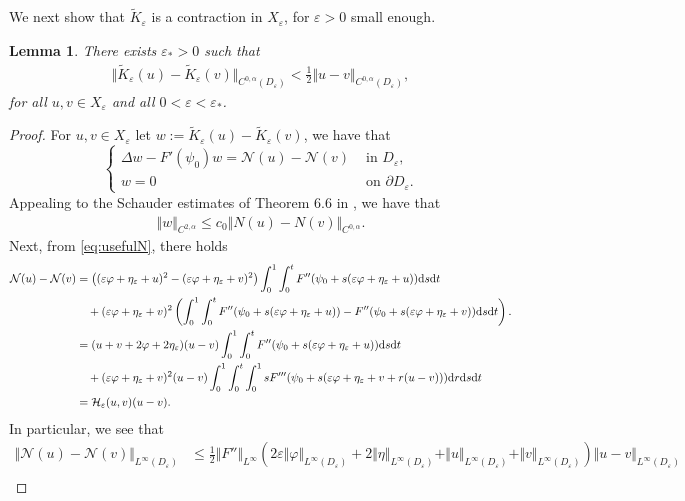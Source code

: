 \documentclass[11pt,reqno]{amsproc}
\newcommand{\N}{\mathcal{N}}
\newcommand{\ve}{\varepsilon}
\newcommand{\rmd}{{\rm d}}
\numberwithin{equation}{section}
\numberwithin{theorem}{section}
\numberwithin{prop}{section}
\numberwithin{cor}{section}
\newtheorem{lemma}{Lemma}
\numberwithin{lemma}{section}
\theoremstyle{remark}
\theoremstyle{definition}
\begin{document}
We next show that $\widetilde{K}_\ve$ is a contraction in $X_\ve$,  for $\ve>0$ small enough.
\begin{lemma}\label{lemma:contraction}
There exists $\ve_*>0$ such that 
\begin{align*}
\Vert \widetilde{K}_\ve(u) - \widetilde{K}_\ve(v) \Vert_{C^{0,\alpha}(D_\ve)} < \frac12 \Vert u - v \Vert_{C^{0,\alpha}(D_\ve)},
\end{align*}
for all $u,v\in X_\ve$ and all $0< \ve < \ve_*$.
\end{lemma}

\begin{proof}
For  $u,v\in X_\ve$ let $w:=\widetilde{K}_\ve(u) - \widetilde{K}_\ve(v)$, we have that 
\begin{equation}
\begin{cases}
\Delta w  - F'(\psi_0)w=  \N(u) - \N(v)  & \text{ in } D_\ve, \\
w = 0 & \text{ on } \partial D_\ve.
\end{cases}
\end{equation}
Appealing to the Schauder estimates of Theorem 6.6 in \cite{gilbargtrudinger}, we have that
\begin{align*}
\Vert w \Vert_{C^{2,\alpha}} \leq c_0 \Vert N(u) - N(v) \Vert_{C^{0,\alpha}}.
\end{align*}
Next, from \eqref{eq:usefulN}, there holds
\begin{align*}
\N(u) - \N(v) &= \left( (\ve\varphi + \eta_\ve + u)^2 - (\ve\varphi + \eta_\ve + v)^2 \right) \int_0^1 \int_0^t F''(\psi_0 + s(\ve\varphi + \eta_\ve + u)) \rmd s \rmd t \\
&\quad +(\ve\varphi + \eta_\ve + v)^2 \left( \int_0^1 \int_0^t F''(\psi_0 + s(\ve\varphi + \eta_\ve + u)) - F''(\psi_0 + s(\ve\varphi + \eta_\ve + v)) \rmd s \rmd t \right). \\
&= (u + v + 2\varphi + 2\eta_\ve)(u-v) \int_0^1 \int_0^t F''(\psi_0 + s(\ve\varphi + \eta_\ve + u)) \rmd s \rmd t \\
&\quad + (\ve\varphi + \eta_\ve + v)^2 (u-v) \int_0^1 \int_0^t \int_0^1 sF'''(\psi_0 + s(\ve\varphi + \eta_\ve + v + r(u-v))) \rmd r \rmd s \rmd t \\
&=\mathcal{H}_\ve(u,v) (u-v).
\end{align*}
In particular, we see that
\begin{align*}
\Vert \N(u) - \N(v) \Vert_{L^\infty(D_\ve)}  &\leq \frac12\Vert F'' \Vert_{L^\infty}\left( 2\ve \Vert \varphi \Vert_{L^\infty(D_\ve)} + 2\Vert \eta \Vert_{L^\infty(D_\ve)} +  \Vert u \Vert_{L^\infty(D_\ve)} + \Vert v \Vert_{L^\infty(D_\ve)} \right) \Vert u - v \Vert_{L^\infty(D_\ve)} \\ 

\end{align*}
\end{proof}
\end{document}
